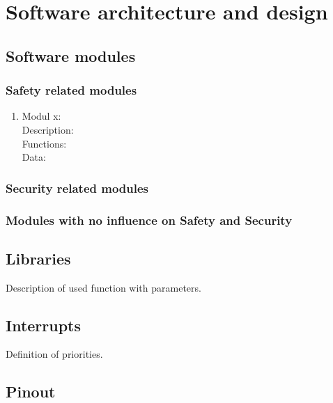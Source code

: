 \section{Software architecture and design}
\label{chapter2}

\subsection{Software modules}


\subsubsection{Safety related modules}
	\begin{enumerate}
		\item Modul x: \\
			Description:\\
			Functions:\\
			Data:\\
	\end{enumerate}


\subsubsection{Security related modules}

\subsubsection{Modules with no influence on Safety and Security}

\subsection{Libraries}

Description of used function with parameters.


\subsection{Interrupts}

Definition of priorities.


\subsection{Pinout}

